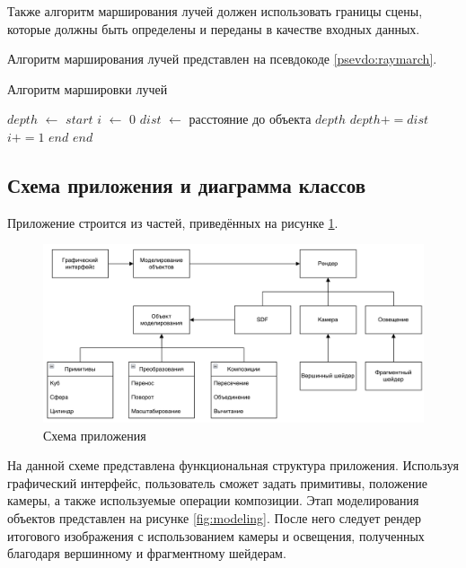 Также  алгоритм марширования лучей  должен  использовать  границы  сцены, 
которые  должны  быть  определены  и  переданы  в  качестве  входных  данных.

Алгоритм марширования лучей представлен на псевдокоде \ref{psevdo:raymarch}.
\begin{algorithm}
	\caption{Алгоритм маршировки лучей}\label{psevdo:raymarch}
	\begin{algorithmic}[1]
		\State $depth$ $\leftarrow$ $start$
		\State $i$ $\leftarrow$ $0$
		\State $dist$ $\leftarrow$ расстояние до объекта
		\State \Return $depth$
		\EndIf
		\State $depth += dist$
		\State $i += 1$
		\State \Return $end$
		\EndIf
		\EndWhile
		\State \Return $end$
		\EndFunction
	\end{algorithmic}
\end{algorithm}

\subsection{Схема приложения и диаграмма классов}

Приложение строится из частей, приведённых на рисунке \ref{fig:app}.
\clearpage

\begin{figure}[h]
	\centering
	\captionsetup{justification=centering}
	\includegraphics[width=160mm]{img/app.png}
	\caption{Схема приложения}
	\label{fig:app}
\end{figure}

На  данной  схеме  представлена  функциональная  структура  приложения.
Используя  графический  интерфейс,  пользователь  сможет  задать  примитивы, 
положение  камеры,  а  также  используемые  операции  композиции.
Этап моделирования  объектов  представлен  на  рисунке  \ref{fig:modeling}.
После  него  следует рендер  итогового  изображения  с  использованием  камеры  и  освещения, полученных благодаря вершинному и фрагментному шейдерам.

